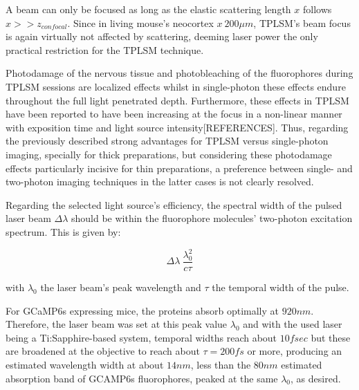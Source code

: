 A beam can only be focused as long as the elastic scattering length $x$ follows $x >> z_{confocal}$. Since in living mouse's neocortex $x ~ 200 \mu m$, TPLSM's beam focus is again virtually not affected by scattering, deeming laser power the only practical restriction for the TPLSM technique.

Photodamage of the nervous tissue and photobleaching of the fluorophores during TPLSM sessions are localized effects whilst in single-photon these effects endure throughout the full light penetrated depth. Furthermore, these effects in TPLSM have been reported to have been increasing at the focus in a non-linear manner with exposition time and light source intensity[REFERENCES]. Thus, regarding the previously described strong advantages for TPLSM versus single-photon imaging, specially for thick preparations, but considering these photodamage effects particularly incisive for thin preparations, a preference between single- and two-photon imaging techniques in the latter cases is not clearly resolved.

Regarding the selected light source's efficiency, the spectral width of the pulsed laser beam $\Delta \lambda$ should be within the fluorophore molecules' two-photon excitation spectrum. This is given by:

\begin{equation}
\Delta \lambda ~ \dfrac{\lambda_0 ^2}{c \tau}
\end{equation} 

with $\lambda_0$ the laser beam's peak wavelength and $\tau$ the temporal width of the pulse. 

For GCaMP6s expressing mice, the proteins absorb optimally at $920 nm$. Therefore, the laser beam was set at this peak value $\lambda_0$ and with the used laser being a Ti:Sapphire-based system, temporal widths reach about $10 fsec$ but these are broadened at the objective to reach about $\tau=200 fs$ or more, producing an estimated wavelength width at about $14 nm$, less than the $80 nm$ estimated absorption band of GCAMP6s fluorophores, peaked at the same $\lambda_0$, as desired.
